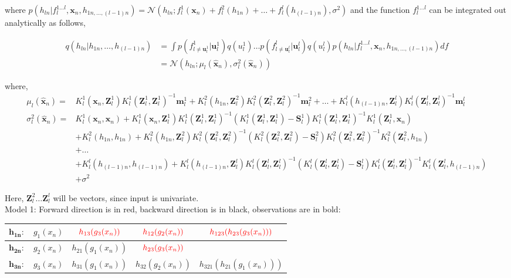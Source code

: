 \documentclass{article}
\begin{document}
where $p(h_{ln}|f_l^{1...l},\mathbf{x}_n,h_{1n,...,(l-1)n}) = \mathcal{N}(h_{ln}; f_l^1(\mathbf{x}_n) + f_l^2(h_{1n}) + \dots + f_l^l(h_{(l-1)n}), \sigma^2)$ and the function $f_l^{1...l}$ can be integrated out analytically as follows,

\begin{align*}
    q(h_{ln}|h_{1n},\dots,h_{(l-1)n}) &= \int  p(f^{1}_{l\neq\mathbf{u}_l^1}|\mathbf{u}_l^1)q(u_l^1)\dots
    p(f^{l}_{l\neq\mathbf{u}_l^l}|\mathbf{u}_l^l)q(u_l^l) p(h_{ln}|f_l^{1...l},\mathbf{x}_n,h_{1n,...,(l-1)n}) df\\
    &= \mathcal{N}(h_{ln}; \mu_l(\hat{\mathbf{x}}_n), \sigma^2_l(\hat{\mathbf{x}}_n))
\end{align*}

where,
\begin{align*}
    \mu_l(\hat{\mathbf{x}}_n) = & K_l^1(\mathbf{x}_n,\mathbf{Z}_l^1)K_l^1(\mathbf{Z}_l^1,\mathbf{Z}_l^1)^{-1}\mathbf{m}_l^1 + K_l^2(h_{1n},\mathbf{Z}_l^2)K_l^2(\mathbf{Z}_l^2,\mathbf{Z}_l^2)^{-1}\mathbf{m}_l^2 + \dots + K_l^l(h_{(l-1)n},\mathbf{Z}_l^l)K_l^l(\mathbf{Z}_l^l,\mathbf{Z}_l^l)^{-1}\mathbf{m}_l^l\\
    \sigma^2_l(\hat{\mathbf{x}}_n) = & K_l^1(\mathbf{x}_n,\mathbf{x}_n)+ K_l^1(\mathbf{x}_n,\mathbf{Z}_l^1)K_l^1(\mathbf{Z}_l^1,\mathbf{Z}_l^1)^{-1}(K_l^1(\mathbf{Z}_l^1,\mathbf{Z}_l^1)-\mathbf{S}_l^1)K_l^1(\mathbf{Z}_l^1,\mathbf{Z}_l^1)^{-1}K_l^1(\mathbf{Z}_l^1,\mathbf{x}_n)\\
    &+ K_l^2(h_{1n},h_{1n})+ K_l^2(h_{1n},\mathbf{Z}_l^2)K_l^2(\mathbf{Z}_l^2,\mathbf{Z}_l^2)^{-1}(K_l^2(\mathbf{Z}_l^2,\mathbf{Z}_l^2)-\mathbf{S}_l^2)K_l^2(\mathbf{Z}_l^2,\mathbf{Z}_l^2)^{-1}K_l^2(\mathbf{Z}_l^2,h_{1n})\\
    & + \dots \\
    &+ K_l^l(h_{(l-1)n},h_{(l-1)n})+ K_l^l(h_{(l-1)n},\mathbf{Z}_l^l)K_l^l(\mathbf{Z}_l^l,\mathbf{Z}_l^l)^{-1}(K_l^l(\mathbf{Z}_l^l,\mathbf{Z}_l^l)-\mathbf{S}_l^l)K_l^l(\mathbf{Z}_l^l,\mathbf{Z}_l^l)^{-1}K_l^l(\mathbf{Z}_l^l,h_{(l-1)n})\\
    &+ \sigma^2
\end{align*}

Here, $\mathbf{Z}_l^2 \dots \mathbf{Z}_l^l$ will be vectors, since input is univariate.\\

Model 1: Forward direction is in red, backward direction is in black, observations are in bold:

\begin{table}[H]
\centering
\begin{tabular}{|c|c|c|c|c|}
	\hline
	$\mathbf{h_{1n}}:$ & $g_1(x_n)$ & $\color{red} h_{13}(g_3(x_n))$ & $\color{red} h_{12}(g_2(x_n))$ & $\color{red} h_{123}(h_{23}(g_3(x_n)))$\\
	\hline
	$\mathbf{h_{2n}}:$ & $g_2(x_n)$ & $h_{21}(g_1(x_n))$ & $\color{red} h_{23}(g_3(x_n))$\\
	\hline
	$\mathbf{h_{3n}}:$ & $g_3(x_n)$ & $h_{31}(g_1(x_n))$ & $h_{32}(g_2(x_n))$ & $ h_{321}(h_{21}(g_1(x_n)))$\\
	\hline
	
\end{tabular}
\end{table}
\end{document}
